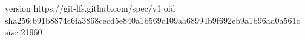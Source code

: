 version https://git-lfs.github.com/spec/v1
oid sha256:b91b8874c6fa3868cecd5e840a1b569c109aa68994b9f692eb9a1b96ad0a561c
size 21960
